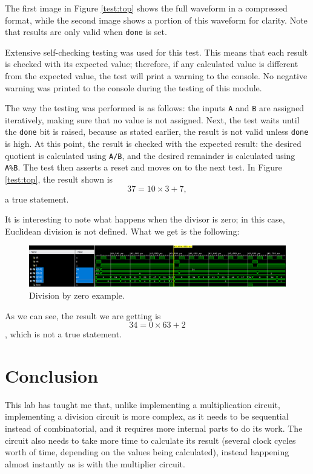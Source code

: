 \documentclass{article}
\renewcommand{\c}[1]{\texttt{#1}}
\begin{document}
The first image in Figure \ref{test:top} shows the full
waveform in a compressed format, while the second image
shows a portion of this waveform for clarity. Note that
results are only valid when \c{done} is set.

Extensive self-checking testing was used for this test. This
means that each result is checked with its expected value;
therefore, if any calculated value is different from the
expected value, the test will print a warning to the console.
No negative warning was printed to the console during the
testing of this module.

The way the testing was performed is as follows: the inputs
\c{A} and \c{B} are assigned iteratively, making sure that
no value is not assigned. Next, the test waits until the
\c{done} bit is raised, because as stated earlier, the
result is not valid unless \c{done} is high. At this point,
the result is checked with the expected result:
the desired quotient is calculated using \c{A/B}, and
the desired remainder is calculated using \c{A\%B}.
The test then
asserts a reset and moves on to the next test. In Figure
\ref{test:top}, the result shown is
\[37 = 10\times3 + 7,\] a true statement.

It is interesting to note what happens when the divisor is
zero; in this case, Euclidean division is not defined. What
we get is the following:

\begin{figure}[H]
    \centering
    \includegraphics[width=\textwidth]{Images/top_waveform_zero}
    \caption{Division by zero example.}
    \label{test:top_zero}
\end{figure}

As we can see, the result we are getting is
\[ 34 = 0 \times 63 + 2 \], which is not a true statement.

\section{Conclusion} This lab has taught me that,
unlike implementing a multiplication circuit, implementing
a division circuit is more complex, as it needs to be
sequential instead of combinatorial, and it requires more
internal parts to do its work. The circuit also needs to
take more time to calculate its result (several clock cycles
worth of time, depending on the values being calculated),
instead happening almost instantly as is with the
multiplier circuit.
\end{document}
